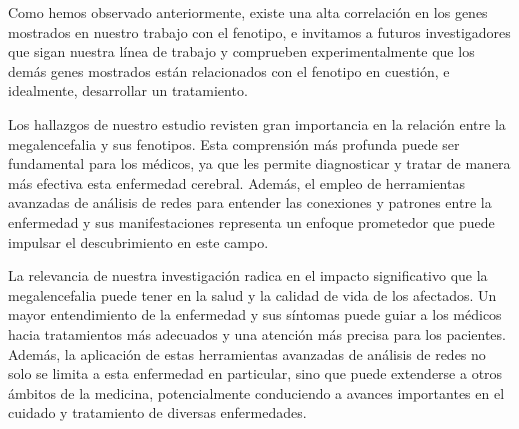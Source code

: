 Como hemos observado anteriormente, existe una alta correlación en los genes mostrados en nuestro trabajo con el fenotipo, e invitamos a futuros investigadores que sigan nuestra línea de trabajo y comprueben experimentalmente que los demás genes mostrados están relacionados con el fenotipo en cuestión, e idealmente, desarrollar un tratamiento.




Los hallazgos de nuestro estudio revisten gran importancia en la relación entre la megalencefalia y sus fenotipos. Esta comprensión más profunda puede ser fundamental para los médicos, ya que les permite diagnosticar y tratar de manera más efectiva esta enfermedad cerebral. Además, el empleo de herramientas avanzadas de análisis de redes para entender las conexiones y patrones entre la enfermedad y sus manifestaciones representa un enfoque prometedor que puede impulsar el descubrimiento en este campo.

La relevancia de nuestra investigación radica en el impacto significativo que la megalencefalia puede tener en la salud y la calidad de vida de los afectados. Un mayor entendimiento de la enfermedad y sus síntomas puede guiar a los médicos hacia tratamientos más adecuados y una atención más precisa para los pacientes. Además, la aplicación de estas herramientas avanzadas de análisis de redes no solo se limita a esta enfermedad en particular, sino que puede extenderse a otros ámbitos de la medicina, potencialmente conduciendo a avances importantes en el cuidado y tratamiento de diversas enfermedades.